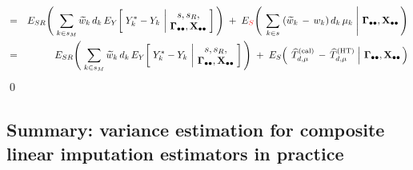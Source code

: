 \begin{enumerate}
\begin{eqnarray*}
    & = &
        E_{SR}\!\left(\;
            \underset{k\in{\color{black}s_{M}}}{\sum}\,\widetilde{w}_{k}\,d_{k}\,
            E_{Y}\!\left[\;
                Y^{*}_{k} \overset{{\color{white}.}}{-} Y_{k}
                \,\left\vert\!
                \begin{array}{c} s,s_{R}, \\ \Gdotdot,\Xobs \end{array}
                \right.
                \!\!\right]
            \,\right)
        \; + \;
        E_{{\color{red}S}}\!\left(\;
            \left.
            \underset{k\in{\color{black}s}}{\sum}\;
            (\widetilde{w}_{k}\,-\,w_{k})\,d_{k}\,\mu_{k}
            \;\right\vert\!\!
            \begin{array}{c} \Gdotdot,\Xobs \end{array}
            \!\!\right)
    \\
    & = &
        E_{SR}\!\left(\;
            \underset{k\in{\color{black}s_{M}}}{\sum}\,\widetilde{w}_{k}\,d_{k}\,
            E_{Y}\!\left[\;
                Y^{*}_{k} \overset{{\color{white}.}}{-} Y_{k}
                \,\left\vert\!
                \begin{array}{c} s,s_{R}, \\ \Gdotdot,\Xobs \end{array}
                \right.
                \!\!\right]
            \,\right)
        \; + \;
        E_{S}\!\left(\;
            \left.
            \widehat{T}^{\textnormal{(cal)}}_{d,\mu}
            \,\overset{{\color{white}.}}{-}\,
            \widehat{T}^{\textnormal{(HT)}}_{d,\mu}
            \;\right\vert\!\!
            \begin{array}{c} \Gdotdot,\Xobs \end{array}
            \!\!\right)
    \end{eqnarray*}
    \qed
\end{enumerate}


\clearpage
\subsection{Summary: variance estimation for composite linear imputation estimators in practice}
\setcounter{theorem}{0}


